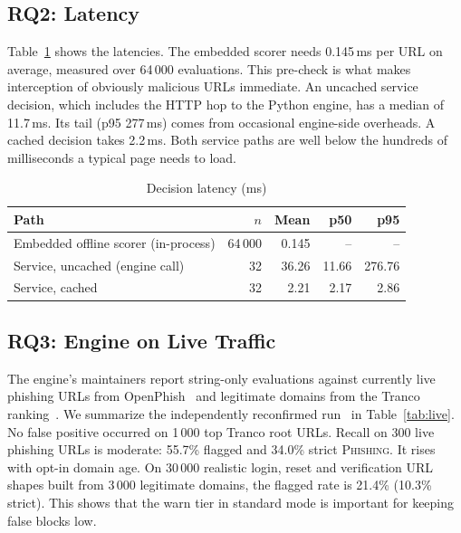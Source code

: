 \documentclass[conference]{IEEEtran}
\begin{document}
\subsection{RQ2: Latency}
Table~\ref{tab:latency} shows the latencies. The embedded scorer needs
0.145\,ms per URL on average, measured over 64\,000 evaluations. This
pre-check is what makes interception of obviously malicious URLs immediate.
An uncached service decision, which includes the HTTP hop to the Python
engine, has a median of 11.7\,ms. Its tail (p95 277\,ms) comes from
occasional engine-side overheads. A cached decision takes 2.2\,ms. Both
service paths are well below the hundreds of milliseconds a typical page
needs to load.

\begin{table}[t]
\centering
\caption{Decision latency (ms)}
\label{tab:latency}
\begin{tabular}{@{}lrrrr@{}}
\toprule
Path & $n$ & Mean & p50 & p95 \\
\midrule
Embedded offline scorer (in-process) & 64\,000 & 0.145 & -- & -- \\
Service, uncached (engine call)       & 32 & 36.26 & 11.66 & 276.76 \\
Service, cached                       & 32 & 2.21 & 2.17 & 2.86 \\
\bottomrule
\end{tabular}
\end{table}

\subsection{RQ3: Engine on Live Traffic}
The engine's maintainers report string-only evaluations against
currently live phishing URLs from OpenPhish~\cite{openphish} and legitimate
domains from the Tranco ranking~\cite{tranco}. We summarize the independently
reconfirmed run~\cite{phishguardai} in Table~\ref{tab:live}. No false positive
occurred on 1\,000 top Tranco root URLs. Recall on 300 live phishing URLs is
moderate: 55.7\% flagged and 34.0\% strict \textsc{Phishing}. It rises with
opt-in domain age. On 30\,000 realistic login, reset and verification URL
shapes built from 3\,000 legitimate domains, the flagged rate is 21.4\% (10.3\%
strict). This shows that the warn tier in standard mode is important for
keeping false blocks low.
\end{document}

